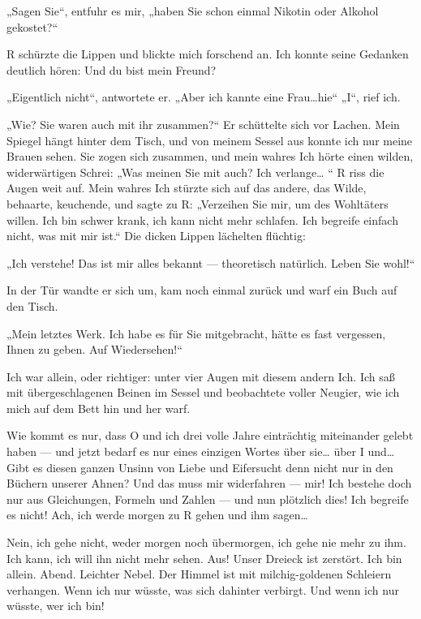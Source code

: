 „Sagen Sie“, entfuhr es mir, „haben Sie schon einmal Nikotin oder
Alkohol gekostet?“

R schürzte die Lippen und blickte mich forschend an. Ich konnte
seine Gedanken deutlich hören: Und du bist mein Freund?

„Eigentlich nicht“, antwortete er. „Aber ich kannte eine Frau\ldots{}hie“
„I“, rief ich.

„Wie? Sie waren auch mit ihr zusammen?“ Er schüttelte sich vor
Lachen. Mein Spiegel hängt hinter dem Tisch, und von meinem Sessel
aus konnte ich nur meine Brauen sehen. Sie zogen sich zusammen, und
mein wahres Ich hörte einen wilden, widerwärtigen Schrei: „Was
meinen Sie mit \glq{}auch\grq{}? Ich verlange\ldots{} “ R
riss die Augen weit auf. Mein wahres Ich stürzte sich auf das
andere, das Wilde, behaarte, keuchende, und sagte zu R: „Verzeihen
Sie mir, um des Wohltäters willen. Ich bin schwer krank, ich kann
nicht mehr schlafen. Ich begreife einfach nicht, was mit mir ist.“
Die dicken Lippen lächelten flüchtig:

„Ich verstehe! Das ist mir alles bekannt — theoretisch natürlich.
Leben Sie wohl!“

In der Tür wandte er sich um, kam noch einmal zurück und warf ein
Buch auf den Tisch.

„Mein letztes Werk. Ich habe es für Sie mitgebracht, hätte es fast
vergessen, Ihnen zu geben. Auf Wiedersehen!“

Ich war allein, oder richtiger: unter vier Augen mit diesem andern
Ich. Ich saß mit übergeschlagenen Beinen im Sessel und beobachtete
voller Neugier, wie ich mich auf dem Bett hin und her warf.

Wie kommt es nur, dass O und ich drei volle Jahre einträchtig
miteinander gelebt haben — und jetzt bedarf es nur eines einzigen
Wortes über sie\ldots{} über I und\ldots{} Gibt es diesen ganzen Unsinn von
Liebe und Eifersucht
denn nicht nur in den Büchern unserer Ahnen? Und das muss mir
widerfahren — mir! Ich bestehe doch nur aus Gleichungen, Formeln
und Zahlen — und nun plötzlich dies! Ich begreife es nicht! Ach,
ich werde morgen zu R gehen und ihm sagen\ldots{}

Nein, ich gehe nicht, weder morgen noch übermorgen, ich gehe nie
mehr zu ihm. Ich kann, ich will ihn nicht mehr sehen. Aus! Unser
Dreieck ist zerstört. Ich bin allein. Abend. Leichter Nebel. Der
Himmel ist mit milchig-goldenen Schleiern verhangen. Wenn ich nur
wüsste, was sich dahinter verbirgt. Und wenn ich nur wüsste, wer
ich bin!

